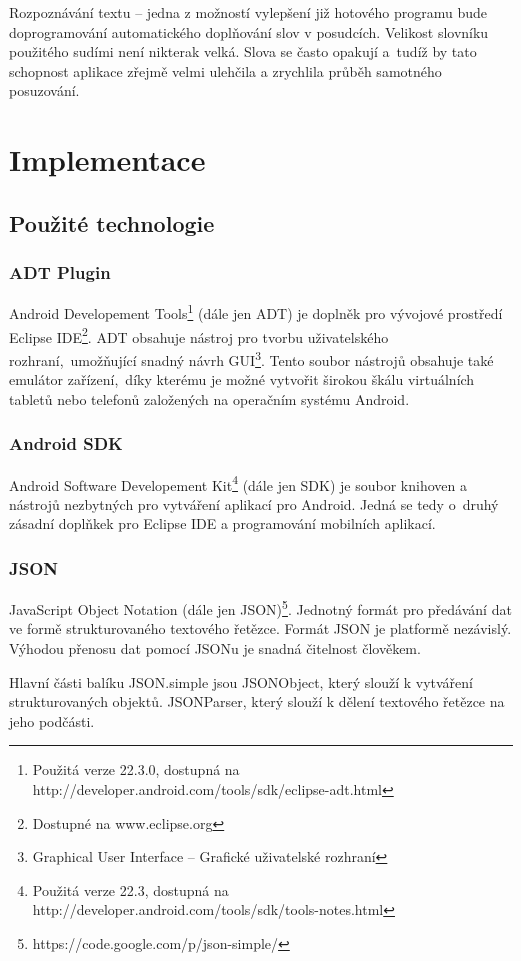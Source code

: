 \documentclass[11pt, oneside]{fithesis2}
\begin{document}
Rozpoznávání textu -- jedna z možností vylepšení již hotového programu bude doprogramování automatického doplňování slov v posudcích.
Velikost slovníku použitého sudími není nikterak velká. Slova se často opakují a~tudíž by tato schopnost aplikace zřejmě velmi ulehčila a zrychlila průběh samotného posuzování.

\chapter{Implementace}
\section{Použité technologie}
\subsection{ADT Plugin}
Android Developement Tools\footnote{Použitá verze 22.3.0, dostupná na http://developer.android.com/tools/sdk/eclipse-adt.html} (dále jen ADT) je doplněk pro vývojové prostředí Eclipse IDE\footnote{Dostupné na www.eclipse.org}.
ADT obsahuje nástroj pro tvorbu uživatelského rozhraní,~umožňující snadný návrh GUI\footnote {Graphical User Interface -- Grafické uživatelské rozhraní}. Tento soubor nástrojů obsahuje také emulátor zařízení,~díky kterému je možné
vytvořit širokou škálu virtuálních tabletů nebo telefonů založených na operačním systému Android.

\subsection{Android SDK}
Android Software Developement Kit\footnote {Použitá verze 22.3, dostupná na http://developer.android.com/tools/sdk/tools-notes.html} (dále jen SDK) je soubor knihoven a nástrojů nezbytných pro vytváření aplikací pro Android.
Jedná se tedy o~druhý zásadní doplňkek pro Eclipse IDE a programování mobilních aplikací.

\subsection{JSON}
JavaScript Object Notation (dále jen JSON)\footnote {https://code.google.com/p/json-simple/}. Jednotný formát pro předávání dat ve formě strukturovaného textového řetězce. Formát JSON je platformě nezávislý.
Výhodou přenosu dat pomocí JSONu je snadná čitelnost člověkem. 

Hlavní části balíku JSON.simple jsou JSONObject, který slouží k vytváření strukturovaných objektů. JSONParser, který slouží k dělení textového řetězce na jeho podčásti.
\end{document}
